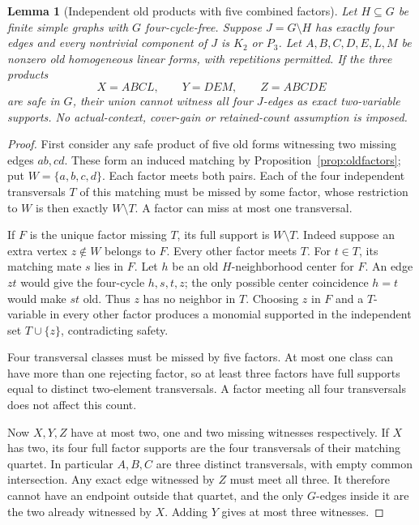 \documentclass[11pt]{article}
\newtheorem{lemma}[theorem]{Lemma}
\theoremstyle{definition}
\theoremstyle{remark}
\begin{document}
\begin{lemma}[Independent old products with five combined factors]\label{lem:independentfive}
Let $H\subseteq G$ be finite simple graphs with $G$ four-cycle-free. Suppose $J=G\setminus H$ has exactly four edges and every nontrivial component of $J$ is $K_2$ or $P_3$. Let $A,B,C,D,E,L,M$ be nonzero old homogeneous linear forms, with repetitions permitted. If the three products
\[
 X=ABCL,\qquad Y=DEM,\qquad Z=ABCDE
\]
are safe in $G$, their union cannot witness all four $J$-edges as exact two-variable supports. No actual-context, cover-gain or retained-count assumption is imposed.
\end{lemma}
\begin{proof}
First consider any safe product of five old forms witnessing two missing edges $ab,cd$. These form an induced matching by Proposition~\ref{prop:oldfactors}; put $W=\{a,b,c,d\}$. Each factor meets both pairs. Each of the four independent transversals $T$ of this matching must be missed by some factor, whose restriction to $W$ is then exactly $W\setminus T$. A factor can miss at most one transversal.

If $F$ is the unique factor missing $T$, its full support is $W\setminus T$. Indeed suppose an extra vertex $z\notin W$ belongs to $F$. Every other factor meets $T$. For $t\in T$, its matching mate $s$ lies in $F$. Let $h$ be an old $H$-neighborhood center for $F$. An edge $zt$ would give the four-cycle $h,s,t,z$; the only possible center coincidence $h=t$ would make $st$ old. Thus $z$ has no neighbor in $T$. Choosing $z$ in $F$ and a $T$-variable in every other factor produces a monomial supported in the independent set $T\cup\{z\}$, contradicting safety.

Four transversal classes must be missed by five factors. At most one class can have more than one rejecting factor, so at least three factors have full supports equal to distinct two-element transversals. A factor meeting all four transversals does not affect this count.

Now $X,Y,Z$ have at most two, one and two missing witnesses respectively. If $X$ has two, its four full factor supports are the four transversals of their matching quartet. In particular $A,B,C$ are three distinct transversals, with empty common intersection. Any exact edge witnessed by $Z$ must meet all three. It therefore cannot have an endpoint outside that quartet, and the only $G$-edges inside it are the two already witnessed by $X$. Adding $Y$ gives at most three witnesses.


\end{proof}
\end{document}
